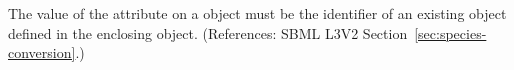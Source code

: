 The value of the attribute  on a \Species object
must be the identifier of an existing \Parameter object defined in the
enclosing \Model object.  (References: SBML L3V2
Section~\ref{sec:species-conversion}.)
